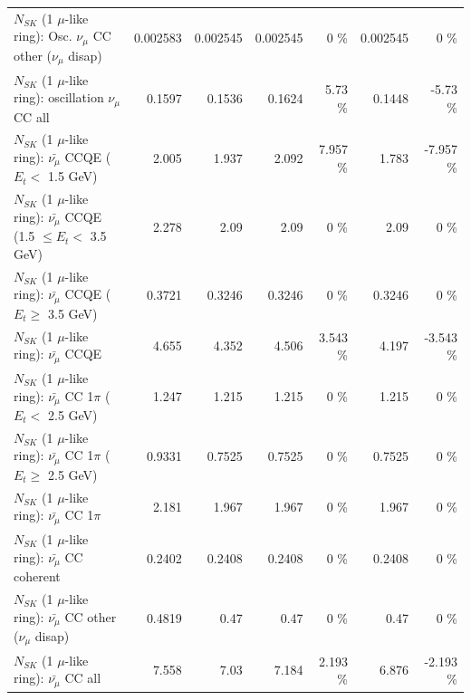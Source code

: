 \begin{table}
\begin{tabular}{| l | r | r | r  r | r  r |}
         $N_{SK}$ (1 $\mu$-like ring): Osc. $\nu_\mu$ CC other ($\nu_\mu$ disap) &        0.002583 &        0.002545 &        0.002545 &        0 \%  &        0.002545 &        0 \%  \\ 
                      $N_{SK}$ (1 $\mu$-like ring): oscillation $\nu_\mu$ CC all &          0.1597 &          0.1536 &          0.1624 &     5.73 \%  &          0.1448 &    -5.73 \%  \\ 
\hline
\hline
          $N_{SK}$ (1 $\mu$-like ring): $\bar{\nu_\mu}$ CCQE ($E_{t} <$ 1.5 GeV) &           2.005 &           1.937 &           2.092 &    7.957 \%  &           1.783 &   -7.957 \%  \\ 
 $N_{SK}$ (1 $\mu$-like ring): $\bar{\nu_\mu}$ CCQE (1.5 $\leq E_{t} <$ 3.5 GeV) &           2.278 &            2.09 &            2.09 &        0 \%  &            2.09 &        0 \%  \\ 
       $N_{SK}$ (1 $\mu$-like ring): $\bar{\nu_\mu}$ CCQE ($E_{t} \geq$ 3.5 GeV) &          0.3721 &          0.3246 &          0.3246 &        0 \%  &          0.3246 &        0 \%  \\ 
\hline
                              $N_{SK}$ (1 $\mu$-like ring): $\bar{\nu_\mu}$ CCQE &           4.655 &           4.352 &           4.506 &    3.543 \%  &           4.197 &   -3.543 \%  \\ 
\hline
     $N_{SK}$ (1 $\mu$-like ring): $\bar{\nu_\mu}$ CC 1$\pi$ ($E_{t} <$ 2.5 GeV) &           1.247 &           1.215 &           1.215 &        0 \%  &           1.215 &        0 \%  \\ 
  $N_{SK}$ (1 $\mu$-like ring): $\bar{\nu_\mu}$ CC 1$\pi$ ($E_{t} \geq$ 2.5 GeV) &          0.9331 &          0.7525 &          0.7525 &        0 \%  &          0.7525 &        0 \%  \\ 
\hline
                         $N_{SK}$ (1 $\mu$-like ring): $\bar{\nu_\mu}$ CC 1$\pi$ &           2.181 &           1.967 &           1.967 &        0 \%  &           1.967 &        0 \%  \\ 
                       $N_{SK}$ (1 $\mu$-like ring): $\bar{\nu_\mu}$ CC coherent &          0.2402 &          0.2408 &          0.2408 &        0 \%  &          0.2408 &        0 \%  \\ 
        $N_{SK}$ (1 $\mu$-like ring): $\bar{\nu_\mu}$ CC other ($\nu_\mu$ disap) &          0.4819 &            0.47 &            0.47 &        0 \%  &            0.47 &        0 \%  \\ 
                          $N_{SK}$ (1 $\mu$-like ring): $\bar{\nu_{\mu}}$ CC all &           7.558 &            7.03 &           7.184 &    2.193 \%  &           6.876 &   -2.193 \%  \\ 

\end{tabular}
\end{table}

